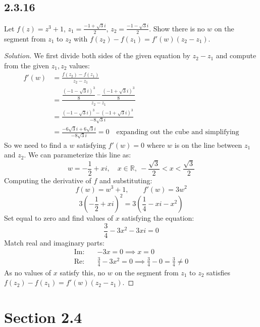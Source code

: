 \documentclass{article}
\newenvironment{solution}{
\begin{proof}[Solution]}{
\end{proof}}
\begin{document}
\subsection*{2.3.16}
Let $f(z) = z^3 + 1$, $z_1 = \frac{-1 + \sqrt{3}i}{2}$, $z_2 = \frac{-1 - \sqrt{3}i}{2}$.
Show there is no $w$ on the segment from $z_1$ to $z_2$ with
$f(z_2) - f(z_1) = f'(w)(z_2 - z_1)$.
\begin{solution}
  We first divide both sides of the given equation by $z_2 - z_1$ and compute from
  the given $z_1, z_2$ values:
  \begin{align*}
    f'(w) &= \frac{f(z_2) - f(z_1)}{z_2 - z_1}
    \\ &= \frac{\dfrac{(-1 - \sqrt{3}i)^3}{8} - \dfrac{(-1 + \sqrt{3}i)^3}{8}}{z_2 - z_1}
    \\ &= \frac{(-1 - \sqrt{3}i)^3 - (-1 + \sqrt{3}i)^3}{-8\sqrt{3}i}
    \\ &= \frac{-6\sqrt{3}i + 6\sqrt{3}i}{-8\sqrt{3}i} = 0
    \quad \text{expanding out the cube and simplifying}
  \end{align*}
  So we need to find a $w$ satisfying $f'(w) = 0$ where $w$ is on the line between
  $z_1$ and $z_2$. We can parameterize this line as:
  \[
    w = -\frac{1}{2} + xi, \quad x \in \mathbb{R},\ -\frac{\sqrt{3}}{2} < x < \frac{\sqrt{3}}{2}
  \]
  Computing the derivative of $f$ and substituting:
  \[
    f(w) = w^3 + 1, \qquad f'(w) = 3w^2
  \]
  \[
    3\left(-\frac{1}{2} + xi\right)^2 = 3\left(\frac{1}{4} - xi - x^2\right)
  \]
  Set equal to zero and find values of $x$ satisfying the equation:
  \[
    \frac{3}{4} - 3x^2 - 3xi = 0
  \]
  Match real and imaginary parts:
  \begin{align*}
    \text{Im:} \quad & -3x = 0 \implies x = 0
    \\ \text{Re:} \quad & \frac{3}{4} - 3x^2 = 0 \implies \frac{3}{4} - 0 = \frac{3}{4} \neq 0
  \end{align*}
  As no values of $x$ satisfy this, no $w$ on the segment from $z_1$ to $z_2$
  satisfies $f(z_2) - f(z_1) = f'(w)(z_2 - z_1)$.
\end{solution}

\section*{Section 2.4}
\end{document}
